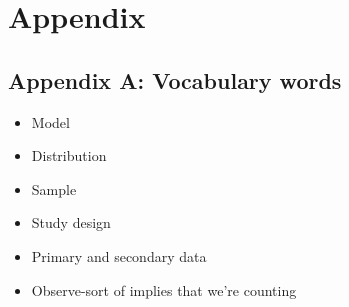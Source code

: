 \documentclass[]{book}
\providecommand{\tightlist}{%
  \setlength{\itemsep}{0pt}\setlength{\parskip}{0pt}}
\begin{document}
\hypertarget{part-appendix}{%
\part{Appendix}\label{part-appendix}}

\hypertarget{appendix-a-vocabulary-words}{%
\chapter*{Appendix A: Vocabulary words}\label{appendix-a-vocabulary-words}}

\begin{itemize}
\tightlist
\item
  Model\\
\item
  Distribution\\
\item
  Sample\\
\item
  Study design\\
\item
  Primary and secondary data\\
\item
  Observe-sort of implies that we're counting
\end{itemize}


\end{document}
